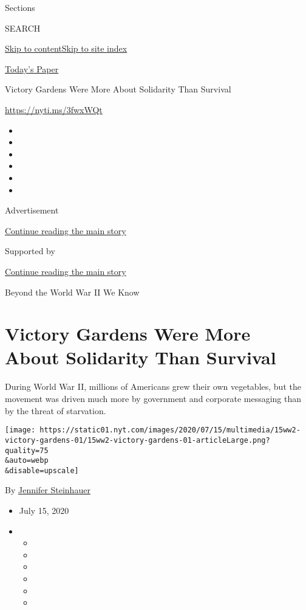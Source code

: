 Sections

SEARCH

\protect\hyperlink{site-content}{Skip to
content}\protect\hyperlink{site-index}{Skip to site index}

\href{https://myaccount.nytimes.com/auth/login?response_type=cookie\&client_id=vi}{}

\href{https://www.nytimes.com/section/todayspaper}{Today's Paper}

Victory Gardens Were More About Solidarity Than Survival

\url{https://nyti.ms/3fwxWQt}

\begin{itemize}
\item
\item
\item
\item
\item
\item
\end{itemize}

Advertisement

\protect\hyperlink{after-top}{Continue reading the main story}

Supported by

\protect\hyperlink{after-sponsor}{Continue reading the main story}

Beyond the World War II We Know

\hypertarget{victory-gardens-were-more-about-solidarity-than-survival}{%
\section{Victory Gardens Were More About Solidarity Than
Survival}\label{victory-gardens-were-more-about-solidarity-than-survival}}

During World War II, millions of Americans grew their own vegetables,
but the movement was driven much more by government and corporate
messaging than by the threat of starvation.

\texttt{[image: https://static01.nyt.com/images/2020/07/15/multimedia/15ww2-victory-gardens-01/15ww2-victory-gardens-01-articleLarge.png?quality=75\\\&auto=webp\\\&disable=upscale]}

By \href{https://www.nytimes.com/by/jennifer-steinhauer}{Jennifer
Steinhauer}

\begin{itemize}
\item
  July 15, 2020
\item
  \begin{itemize}
  \item
  \item
  \item
  \item
  \item
  \item
  \end{itemize}
\end{itemize}

